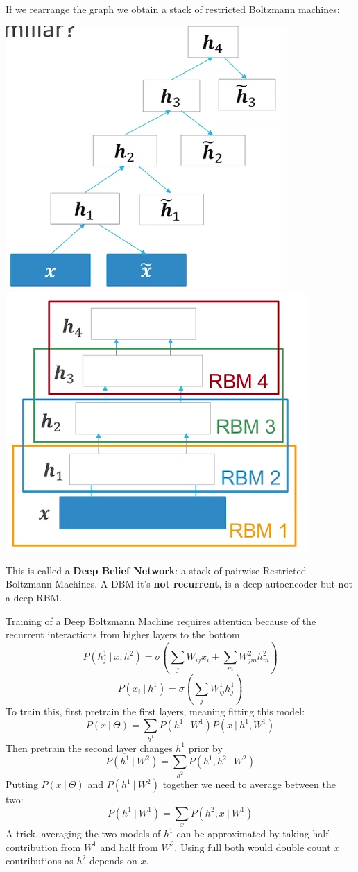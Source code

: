 \documentclass[10pt]{report}
\begin{document}
If we rearrange the graph we obtain a stack of restricted Boltzmann machines:\begin{center}
	\includegraphics[scale=0.5]{81.png}
	\includegraphics[scale=0.5]{82.png}
\end{center}
This is called a \textbf{Deep Belief Network}: a stack of pairwise Restricted Boltzmann Machines. A DBM it's \textbf{not recurrent}, is a deep autoencoder but not a deep RBM.\\
\pagebreak

Training of a Deep Boltzmann Machine requires attention because of the recurrent interactions from higher layers to the bottom.
$$P(h_j^1\:|\:x,h^2)=\sigma\left(\sum_jW_{ij}x_i+\sum_m W^2_{jm}h_m^2\right)$$
$$P(x_i\:|\:h^1)=\sigma\left(\sum_jW_{ij}^1h_j^1\right)$$
To train this, first pretrain the first layers, meaning fitting this model:
$$P(x\:|\:\Theta) =\sum_{h^1}P(h^1\:|\:W^1)P(x\:|\:h^1,W^1)$$
Then pretrain the second layer changes $h^1$ prior by
$$P(h^1\:|\:W^2) = \sum_{h^2}P(h^1,h^2\:|\:W^2)$$
Putting $P(x\:|\:\Theta)$ and $P(h^1\:|\:W^2)$ together we need to average between the two:
$$P(h^1\:|\:W^1) = \sum_x P(h^2,x\:|\:W^1)$$
A trick, averaging the two models of $h^1$ can be approximated by taking half contribution from $W^1$ and half from $W^2$. Using full both would double count $x$ contributions as $h^2$ depends on $x$.
\end{document}
